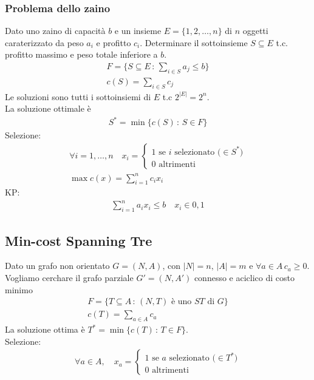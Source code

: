\documentclass[a4paper,12pt]{article}
\begin{document}
\subsubsection{Problema dello zaino}
Dato uno zaino di capacità $b$ e un insieme $E=\{1,2,\dots,n\}$ di $n$ oggetti caraterizzato da peso $a_i$ e profitto $c_i$. Determinare il sottoinsieme $S \subseteq E$ t.c. profitto massimo e peso totale inferiore a $b$.
\begin{align*}
  F = \{S \subseteq E \, : \, \sum_{i \in S} a_j \leq b\}\\
  c(S) = \sum_{i \in S} c_j
\end{align*}
Le soluzioni sono tutti i sottoinsiemi di $E$ t.c $2^{|E|}=2^n$. \\
La soluzione ottimale è
\begin{align*}
  S^* = \min\{c(S) \, : \, S \in F\}
\end{align*}
Selezione:
\begin{align*}
\forall i=1,\dots,n \quad x_i = \begin{cases}
  1 \text{ se $i$ selezionato ($\in S^*$)}\\
  0 \text{ altrimenti}
\end{cases}\\
\max c(x) = \sum_{i=1}^n c_i x_i
\end{align*}
KP: 
\begin{align*}
  \sum_{i=1}^n a_i x_i \leq b \quad x_i \in {0,1}
\end{align*}
\subsection*{Min-cost Spanning Tre}
Dato un grafo non orientato $G=(N,A)$, con $|N|=n, \, |A|=m$ e $\forall a \in A \, c_a \geq 0$. Vogliamo cerchare il grafo parziale $G'=(N,A')$ connesso e aciclico di costo minimo
\begin{align*}
  F = \{T \subseteq A \, : \, (N,T) \text{ è uno $ST$ di $G$}\}\\
  c(T) = \sum_{a \in A} c_a
\end{align*}
La soluzione ottima è $T^* = \min\{c(T) \, : \, T \in F\}$.\\
Selezione:
\begin{align*}
  \forall a \in A, \quad x_a = \begin{cases}
  1 \text{ se $a$ selezionato ($\in T^*$)} \\
  0 \text{ altrimenti}
  \end{cases}
\end{align*}
\end{document}

